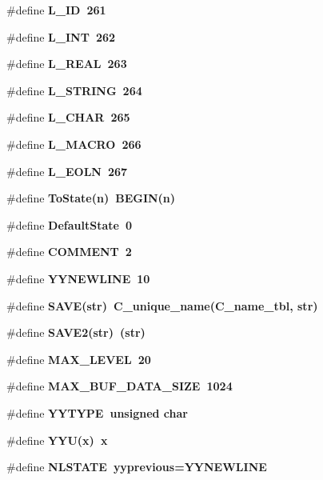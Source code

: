 \begin{CompactItemize}
\#define \bf{L\_\-ID}~261
\item 
\#define \bf{L\_\-INT}~262
\item 
\#define \bf{L\_\-REAL}~263
\item 
\#define \bf{L\_\-STRING}~264
\item 
\#define \bf{L\_\-CHAR}~265
\item 
\#define \bf{L\_\-MACRO}~266
\item 
\#define \bf{L\_\-EOLN}~267
\item 
\#define \bf{To\-State}(n)~BEGIN(n)
\item 
\#define \bf{Default\-State}~0
\item 
\#define \bf{COMMENT}~2
\item 
\#define \bf{YYNEWLINE}~10
\item 
\#define \bf{SAVE}(str)~C\_\-unique\_\-name(\bf{C\_\-name\_\-tbl}, str)
\item 
\#define \bf{SAVE2}(str)~(str)
\item 
\#define \bf{MAX\_\-LEVEL}~20
\item 
\#define \bf{MAX\_\-BUF\_\-DATA\_\-SIZE}~1024
\item 
\#define \bf{YYTYPE}~unsigned char
\item 
\#define \bf{YYU}(x)~x
\item 
\#define \bf{NLSTATE}~\bf{yyprevious}=YYNEWLINE
\end{CompactItemize}
